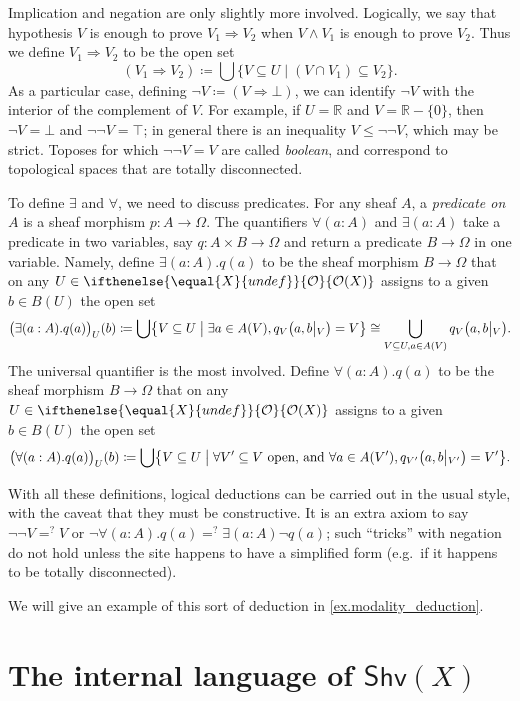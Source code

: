 \documentclass[reqno,11pt]{amsproc}
\theoremstyle{plain}
\theoremstyle{definition}
\newcommand{\cat}[1]{\mathsf{#1}}
\renewcommand{\to}[1][]{\xrightarrow{#1}}
\newcommand{\tn}[1]{\textnormal{#1}}
\newcommand{\rr}{\mathbb{R}}
\newcommand{\shv}{\cat{Shv}}
\newcommand{\Op}[1][undef]{\ifthenelse{\equal{#1}{undef}}{\mathcal{O}}{\mathcal{O}(#1)}}
\newcommand{\rest}[2]{#1\big|\hspace{0in}_{#2}}
\newcommand{\imp}{\Rightarrow}
\newcommand{\true}{\top}
\newcommand{\false}{\bot}
\let\originalleft\left
\let\originalright\right
\renewcommand{\left}{\mathopen{}\mathclose\bgroup\originalleft}
\renewcommand{\right}{\aftergroup\egroup\originalright}
\numberwithin{equation}{section}
\begin{document}
Implication and negation are only slightly more involved. Logically, we say that hypothesis $V$ is enough to prove $V_1\imp V_2$ when $V\wedge V_1$ is enough to prove $V_2$. Thus we define $V_1\imp V_2$ to be the open set
\begin{equation}\label{eqn.implication}
	(V_1\imp V_2)\coloneqq\bigcup\{V\subseteq U\mid (V\cap V_1)\subseteq V_2\}.
\end{equation}
 As a particular case, defining $\neg V\coloneqq (V\imp \false)$, we can identify $\neg V$ with the interior of the complement of $V$. For example, if $U=\rr$ and $V=\rr-\{0\}$, then $\neg V=\false$ and $\neg\neg V=\true$; in general there is an inequality $V\leq\neg\neg V$, which may be strict. Toposes for which $\neg\neg V=V$ are called \emph{boolean}, and correspond to topological spaces that are totally disconnected.

To define $\exists$ and $\forall$, we need to discuss predicates. For any sheaf $A$, a \emph{predicate on $A$} is a sheaf morphism $p\colon A\to\Omega$. The quantifiers $\forall(a:A)$ and $\exists(a:A)$ take a predicate in two variables, say $q\colon A\times B\to\Omega$ and return a predicate $B\to\Omega$ in one variable. Namely, define $\exists(a:A).q(a)$ to be the sheaf morphism $B\to\Omega$ that on any $U\in\Op[X]$ assigns to a given $b\in B(U)$ the open set
\[
\big(\exists(a:A).q(a)\big)_U(b)\coloneqq\bigcup\left\{V\subseteq U\;\middle|\;\exists a\in A(V), q_V\big(a,\rest{b}{V}\big)=V\right\}\cong\bigcup_{V\subseteq U,a\in A(V)}q_V\big(a,\rest{b}{V}\big).
\]
The universal quantifier is the most involved. Define $\forall(a:A).q(a)$ to be the sheaf morphism $B\to\Omega$ that on any $U\in\Op[X]$ assigns to a given $b\in B(U)$ the open set
\[
\big(\forall(a:A).q(a)\big)_U(b)\coloneqq\bigcup\left\{V\subseteq U\;\middle|\;
\forall V'\subseteq V \tn{ open, and } \forall a\in A(V'), q_{V'}\big(a,\rest{b}{V'}\big)=V'\right\}.
\]

With all these definitions, logical deductions can be carried out in the usual style, with the caveat that they must be constructive. It is an extra axiom to say $\neg\neg V=^?V$ or $\neg\forall (a:A).q(a) =^? \exists (a:A)\neg q(a)$; such ``tricks'' with negation do not hold unless the site happens to have a simplified form (e.g.\ if it happens to be totally disconnected).

We will give an example of this sort of deduction in \cref{ex.modality_deduction}.

\section{The internal language of $\shv(X)$}\label{sec.internal_language}
\end{document}
